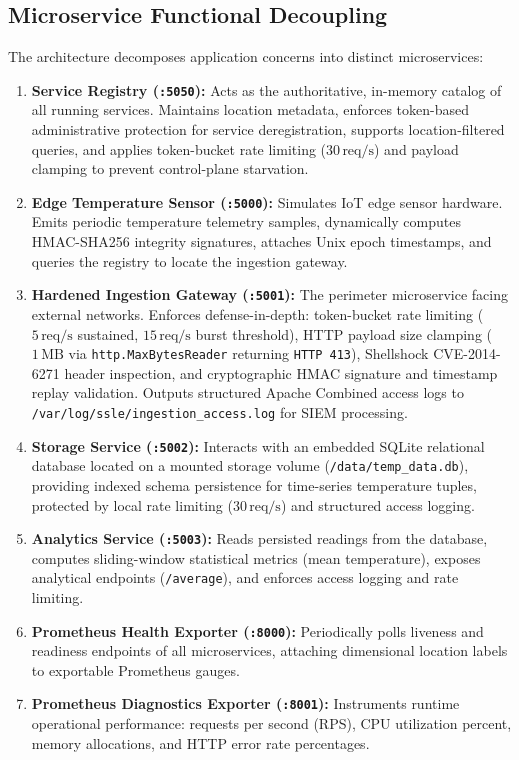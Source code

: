 \subsection{Microservice Functional Decoupling}
The architecture decomposes application concerns into distinct microservices:
\begin{enumerate}
    \item \textbf{Service Registry (\texttt{:5050}):} Acts as the authoritative, in-memory catalog of all running services. Maintains location metadata, enforces token-based administrative protection for service deregistration, supports location-filtered queries, and applies token-bucket rate limiting ($30\,\text{req/s}$) and payload clamping to prevent control-plane starvation.
    \item \textbf{Edge Temperature Sensor (\texttt{:5000}):} Simulates IoT edge sensor hardware. Emits periodic temperature telemetry samples, dynamically computes HMAC-SHA256 integrity signatures, attaches Unix epoch timestamps, and queries the registry to locate the ingestion gateway.
    \item \textbf{Hardened Ingestion Gateway (\texttt{:5001}):} The perimeter microservice facing external networks. Enforces defense-in-depth: token-bucket rate limiting ($5\,\text{req/s}$ sustained, $15\,\text{req/s}$ burst threshold), HTTP payload size clamping ($1\,\text{MB}$ via \texttt{http.MaxBytesReader} returning \texttt{HTTP 413}), Shellshock CVE-2014-6271 header inspection, and cryptographic HMAC signature and timestamp replay validation. Outputs structured Apache Combined access logs to \texttt{/var/log/ssle/}\allowbreak\texttt{ingestion\_access.log} for SIEM processing.
    \item \textbf{Storage Service (\texttt{:5002}):} Interacts with an embedded SQLite relational database located on a mounted storage volume (\texttt{/data/temp\_data.db}), providing indexed schema persistence for time-series temperature tuples, protected by local rate limiting ($30\,\text{req/s}$) and structured access logging.
    \item \textbf{Analytics Service (\texttt{:5003}):} Reads persisted readings from the database, computes sliding-window statistical metrics (mean temperature), exposes analytical endpoints (\texttt{/average}), and enforces access logging and rate limiting.
    \item \textbf{Prometheus Health Exporter (\texttt{:8000}):} Periodically polls liveness and readiness endpoints of all microservices, attaching dimensional location labels to exportable Prometheus gauges.
    \item \textbf{Prometheus Diagnostics Exporter (\texttt{:8001}):} Instruments runtime operational performance: requests per second (RPS), CPU utilization percent, memory allocations, and HTTP error rate percentages.
\end{enumerate}

